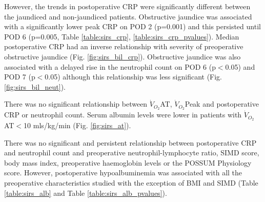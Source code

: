 However, the trends in postoperative CRP were significantly different between the jaundiced and non-jaundiced patients. 
Obstructive jaundice was associated with a significantly lower peak CRP on POD 2 (p=0.001) and this persisted until POD 6 (p=0.005, Table \ref{table:sirs_crp}, \ref{table:sirs_crp_pvalues}).
Median postoperative CRP had an inverse relationship with severity of preoperative obstructive jaundice (Fig. \ref{fig:sirs_bil_crp}).
Obstructive jaundice was also associated with a delayed rise in the neutrophil count on POD 6 (p$<$0.05) and POD 7 (p$<$0.05) although this relationship was less significant (Fig. \ref{fig:sirs_bil_neut}). 

There was no significant relationship between $\dot{V}_{O_2}$AT, $\dot{V}_{O_2}$Peak and postoperative CRP or neutrophil count. 
Serum albumin levels were lower in patients with $\dot{V}_{O_2}$AT$<$10 mls/kg/min (Fig. \ref{fig:sirs_at}).

There was no significant and persistent relationship between postoperative CRP and neutrophil count and preoperative neutrophil-lymphocyte ratio, SIMD score, body mass index, preoperative haemoglobin levels or the POSSUM Physiology score. 
However, postoperative hypoalbuminemia was associated with all the preoperative characteristics studied with the exception of BMI and SIMD (Table \ref{table:sirs_alb} and Table \ref{table:sirs_alb_pvalues}).











